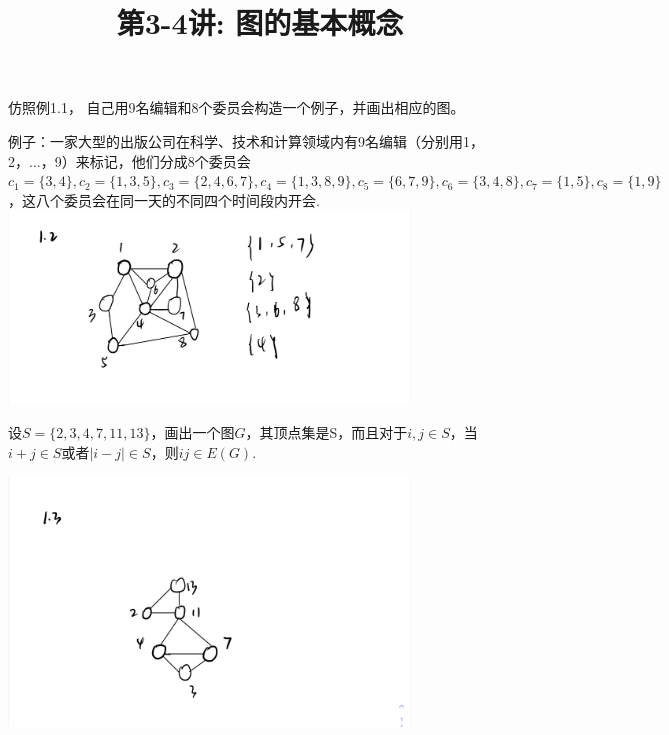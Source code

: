 \documentclass[a4paper, justified]{tufte-handout}
\title{第3-4讲: 图的基本概念}
\date{\zhtoday} %
\begin{document}
\maketitle
\noplagiarism %
\begin{abstract}
\end{abstract}
\beginrequired

\begin{problem}[CZ 1.2]
仿照例1.1， 自己用9名编辑和8个委员会构造一个例子，并画出相应的图。
\end{problem}

\begin{solution}
	例子：一家大型的出版公司在科学、技术和计算领域内有9名编辑（分别用1，2，...，9）来标记，他们分成8个委员会$c_1 = \{3,4\}, c_2 = \{1,3,5\}, c_3 = \{2,4,6,7\}, c_4 =\{1,3,8,9\},c_5=\{6,7,9\},c_6=\{3,4,8\},c_7=\{1,5\},c_8=\{1,9\}$，这八个委员会在同一天的不同四个时间段内开会.
	\includegraphics[width = 0.8\textwidth]{1.2.jpg}
\end{solution}

\begin{problem}[CZ 1.3]
设$S = \{2,3,4,7,11,13\}$，画出一个图$G$，其顶点集是S，而且对于$i,j\in S$，当$i+j\in S$或者$|i-j|\in S$，则$ij\in E(G)$.
\end{problem}

\begin{solution}
	\includegraphics[width = 0.8\textwidth]{1.3.jpg}
\end{solution}
\end{document}
